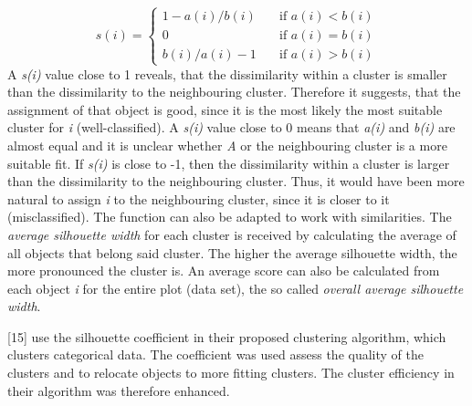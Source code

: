   \[ s(i) =
  \begin{cases}
    1 - a(i)/b(i)       & \quad \text{if } a(i) < b(i)\\
    0       & \quad \text{if } a(i) = b(i)\\
 b(i)/a(i) - 1      & \quad \text{if } a(i) > b(i)

  \end{cases}
\]
A \textit{s(i)} value close to 1 reveals, that the dissimilarity within a cluster is smaller than the dissimilarity to the neighbouring cluster. Therefore it suggests, that the assignment of that object is good, since it is the most likely the most suitable cluster for \textit{i} (well-classified). A \textit{s(i)} value close to 0 means that \textit{a(i)} and \textit{b(i)} are almost equal and it is unclear whether \textit{A} or the neighbouring cluster is a more suitable fit. If \textit{s(i)} is close to -1, then the dissimilarity within a cluster is larger than the dissimilarity to the neighbouring cluster. Thus, it would have been more natural to assign \textit{i} to the neighbouring cluster, since it is closer to it (misclassified). The function can also be adapted to work with similarities.
The \textit{average silhouette width} for each cluster is received by calculating the average of all objects that belong said cluster. The higher the average silhouette width, the more pronounced the cluster is. An average score can also be calculated from each object \textit{i} for the entire plot (data set), the so called \textit{overall average silhouette width}. 

\textcite{silhouetteRelocatingMeasure}[15] use the silhouette coefficient in their proposed clustering algorithm, which clusters categorical data. The coefficient was used assess the quality of the clusters and to relocate objects to more fitting clusters. The cluster efficiency in their algorithm was therefore enhanced.


